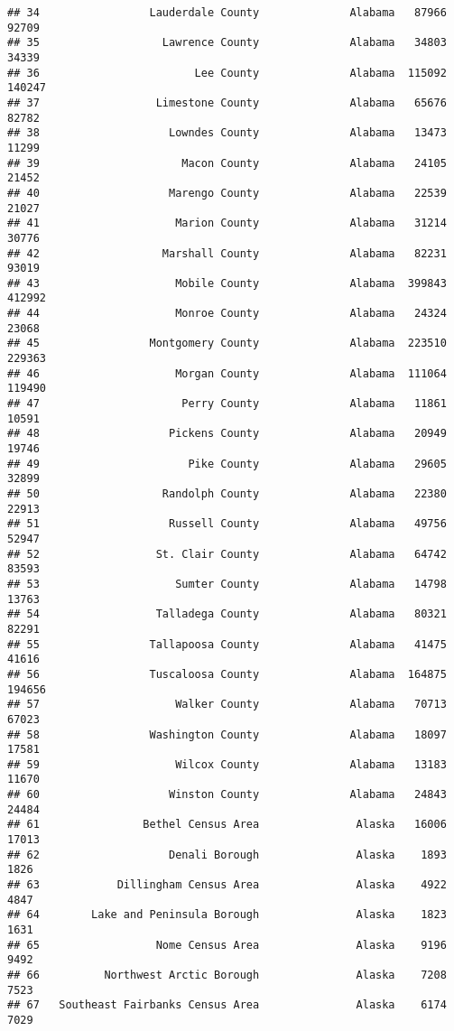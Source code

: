 \documentclass[
]{article}
\begin{document}
\begin{verbatim}
## 34                 Lauderdale County              Alabama   87966   92709
## 35                   Lawrence County              Alabama   34803   34339
## 36                        Lee County              Alabama  115092  140247
## 37                  Limestone County              Alabama   65676   82782
## 38                    Lowndes County              Alabama   13473   11299
## 39                      Macon County              Alabama   24105   21452
## 40                    Marengo County              Alabama   22539   21027
## 41                     Marion County              Alabama   31214   30776
## 42                   Marshall County              Alabama   82231   93019
## 43                     Mobile County              Alabama  399843  412992
## 44                     Monroe County              Alabama   24324   23068
## 45                 Montgomery County              Alabama  223510  229363
## 46                     Morgan County              Alabama  111064  119490
## 47                      Perry County              Alabama   11861   10591
## 48                    Pickens County              Alabama   20949   19746
## 49                       Pike County              Alabama   29605   32899
## 50                   Randolph County              Alabama   22380   22913
## 51                    Russell County              Alabama   49756   52947
## 52                  St. Clair County              Alabama   64742   83593
## 53                     Sumter County              Alabama   14798   13763
## 54                  Talladega County              Alabama   80321   82291
## 55                 Tallapoosa County              Alabama   41475   41616
## 56                 Tuscaloosa County              Alabama  164875  194656
## 57                     Walker County              Alabama   70713   67023
## 58                 Washington County              Alabama   18097   17581
## 59                     Wilcox County              Alabama   13183   11670
## 60                    Winston County              Alabama   24843   24484
## 61                Bethel Census Area               Alaska   16006   17013
## 62                    Denali Borough               Alaska    1893    1826
## 63            Dillingham Census Area               Alaska    4922    4847
## 64        Lake and Peninsula Borough               Alaska    1823    1631
## 65                  Nome Census Area               Alaska    9196    9492
## 66          Northwest Arctic Borough               Alaska    7208    7523
## 67   Southeast Fairbanks Census Area               Alaska    6174    7029

\end{verbatim}
\end{document}
